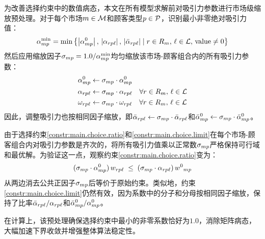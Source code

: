 为改善选择约束中的数值病态，本文在所有模型求解前对吸引力参数进行市场级缩放预处理。对于每个市场$m \in \mathcal{M}$和顾客类型$p \in \mathcal{P}$，识别最小非零绝对吸引力值：
\begin{equation*}
    \alpha^{\min}_{mp} = \min \left\{ \left|\alpha^0_{mp}\right|, \, \left|\alpha_{rp\ell}\right|, \, \left|\bar{\alpha}_{rp\ell}\right| \mid r \in R_m, \, \ell \in \mathcal{L}, \, \text{value} \neq 0 \right\}
\end{equation*}
然后应用缩放因子$\sigma_{mp} = 1.0 / \alpha^{\min}_{mp}$均匀缩放该市场-顾客组合内的所有吸引力参数：
\begin{equation*}
\begin{aligned}
    \alpha^0_{mp} &\leftarrow \sigma_{mp} \cdot \alpha^0_{mp}\\
    \alpha_{rp\ell} &\leftarrow \sigma_{mp} \cdot \alpha_{rp\ell} \quad \forall r \in R_m, \, \ell \in \mathcal{L}\\
    \omega_{rp\ell} &\leftarrow \sigma_{mp} \cdot \omega_{rp\ell} \quad \forall r \in R_m, \, \ell \in \mathcal{L}
\end{aligned}
\end{equation*}
因此，调整吸引力也按相同因子缩放，即$\bar{\alpha}_{rp\ell} \leftarrow \sigma_{mp} \cdot \bar{\alpha}_{rp\ell}$和$\bar{\alpha}^0_{mp} \leftarrow \sigma_{mp} \cdot \bar{\alpha}^0_{mp}$。

由于选择约束\eqref{constr:main.choice.ratio}和\eqref{constr:main.choice.limit}在每个市场-顾客组合内对吸引力参数是齐次的，将所有吸引力值乘以正常数$\sigma_{mp}$严格保持可行域和最优解。为验证这一点，观察约束\eqref{constr:main.choice.ratio}变为：
\begin{equation*}
    (\sigma_{mp} \cdot \alpha^0_{mp})\, w_{rp\ell} \;\le\; (\sigma_{mp} \cdot \alpha_{rp\ell})\, {w^0}_{mp}
\end{equation*}
从两边消去公共正因子$\sigma_{mp}$后等价于原始约束。类似地，约束\eqref{constr:main.choice.limit}仍然有效，因为系数中的分子和分母按相同因子缩放，保持了比率$\bar{\alpha}_{rp\ell}/\alpha_{rp\ell}$和$\bar{\alpha}^0_{mp}/\alpha^0_{mp}$。

在计算上，该预处理确保选择约束中最小的非零系数恰好为$1.0$，消除矩阵病态，大幅加速下界收敛并增强整体算法稳定性。
